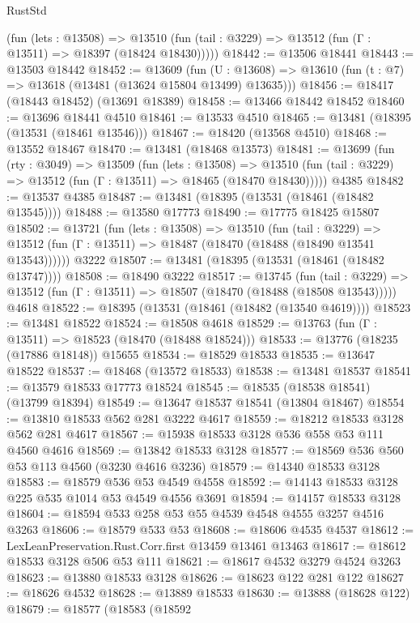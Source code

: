 \begin{lexlean}{RustStd}
\begin{coremodule}
      (fun (lets : @13508) =>
      @13510 (fun (tail : @3229) => @13512 (fun (Γ : @13511) => @18397 (@18424 @18430)))))
@18442 := @13506 @18441
@18443 := @13503 @18442
@18452 := @13609
    (fun (U : @13608) => @13610 (fun (t : @7) => @13618 (@13481 (@13624 @15804 @13499) @13635)))
@18456 := @18417 (@18443 @18452) (@13691 @18389)
@18458 := @13466 @18442 @18452
@18460 := @13696 @18441 @4510
@18461 := @13533 @4510
@18465 := @13481 (@18395 (@13531 (@18461 @13546)))
@18467 := @18420 (@13568 @4510)
@18468 := @13552 @18467
@18470 := @13481 (@18468 @13573)
@18481 := @13699
    (fun (rty : @3049) =>
    @13509
      (fun (lets : @13508) =>
      @13510 (fun (tail : @3229) => @13512 (fun (Γ : @13511) => @18465 (@18470 @18430)))))
    @4385
@18482 := @13537 @4385
@18487 := @13481 (@18395 (@13531 (@18461 (@18482 @13545))))
@18488 := @13580 @17773
@18490 := @17775 @18425 @15807
@18502 := @13721
    (fun (lets : @13508) =>
    @13510
      (fun (tail : @3229) =>
      @13512 (fun (Γ : @13511) => @18487 (@18470 (@18488 (@18490 @13541 @13543))))))
    @3222
@18507 := @13481 (@18395 (@13531 (@18461 (@18482 @13747))))
@18508 := @18490 @3222
@18517 := @13745
    (fun (tail : @3229) => @13512 (fun (Γ : @13511) => @18507 (@18470 (@18488 (@18508 @13543)))))
    @4618
@18522 := @18395 (@13531 (@18461 (@18482 (@13540 @4619))))
@18523 := @13481 @18522
@18524 := @18508 @4618
@18529 := @13763 (fun (Γ : @13511) => @18523 (@18470 (@18488 @18524)))
@18533 := @13776 (@18235 (@17886 @18148)) @15655
@18534 := @18529 @18533
@18535 := @13647 @18522
@18537 := @18468 (@13572 @18533)
@18538 := @13481 @18537
@18541 := @13579 @18533 @17773 @18524
@18545 := @18535 (@18538 @18541) (@13799 @18394)
@18549 := @13647 @18537 @18541 (@13804 @18467)
@18554 := @13810 @18533 @562 @281 @3222 @4617
@18559 := @18212 @18533 @3128 @562 @281 @4617
@18567 := @15938 @18533 @3128 @536 @558 @53 @111 @4560 @4616
@18569 := @13842 @18533 @3128
@18577 := @18569 @536 @560 @53 @113 @4560 (@3230 @4616 @3236)
@18579 := @14340 @18533 @3128
@18583 := @18579 @536 @53 @4549 @4558
@18592 := @14143 @18533 @3128 @225 @535 @1014 @53 @4549 @4556 @3691
@18594 := @14157 @18533 @3128
@18604 := @18594 @533 @258 @53 @55 @4539 @4548 @4555 @3257 @4516 @3263
@18606 := @18579 @533 @53
@18608 := @18606 @4535 @4537
@18612 := LexLeanPreservation.Rust.Corr.first @13459 @13461 @13463
@18617 := @18612 @18533 @3128 @506 @53 @111
@18621 := @18617 @4532 @3279 @4524 @3263
@18623 := @13880 @18533 @3128
@18626 := @18623 @122 @281 @122
@18627 := @18626 @4532
@18628 := @13889 @18533
@18630 := @13888 (@18628 @122)
@18679 := @18577
    (@18583
      (@18592

\end{coremodule}
\end{lexlean}
